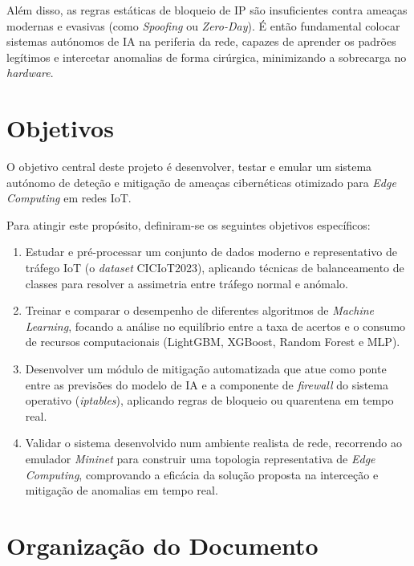 Além disso, as regras estáticas de bloqueio de \ac{IP} são insuficientes contra ameaças modernas e evasivas (como \textit{Spoofing} ou \textit{Zero-Day}). É então fundamental colocar sistemas autónomos de \ac{IA} na periferia da rede, capazes de aprender os padrões legítimos e intercetar anomalias de forma cirúrgica, minimizando a sobrecarga no \textit{hardware}.

\section{Objetivos}
\label{sec:obj}

O objetivo central deste projeto é desenvolver, testar e emular um sistema autónomo de deteção e mitigação de ameaças cibernéticas otimizado para \textit{Edge Computing} em redes \ac{IoT}. 

Para atingir este propósito, definiram-se os seguintes objetivos específicos:
\begin{enumerate}
    \item Estudar e pré-processar um conjunto de dados moderno e representativo de tráfego \ac{IoT} (o \textit{dataset} CICIoT2023), aplicando técnicas de balanceamento de classes para resolver a assimetria entre tráfego normal e anómalo.
    \item Treinar e comparar o desempenho de diferentes algoritmos de \textit{Machine Learning}, focando a análise no equilíbrio entre a taxa de acertos e o consumo de recursos computacionais (\ac{LightGBM}, \ac{XGBoost}, Random Forest e \ac{MLP}).
    \item Desenvolver um módulo de mitigação automatizada que atue como ponte entre as previsões do modelo de \ac{IA} e a componente de \textit{firewall} do sistema operativo (\textit{iptables}), aplicando regras de bloqueio ou quarentena em tempo real.
  \item Validar o sistema desenvolvido num ambiente realista de rede, recorrendo ao emulador \textit{Mininet} para construir uma topologia representativa de \textit{Edge Computing}, comprovando a eficácia da solução proposta na interceção e mitigação de anomalias em tempo real.
\end{enumerate}
\section{Organização do Documento}
\label{sec:organ}


